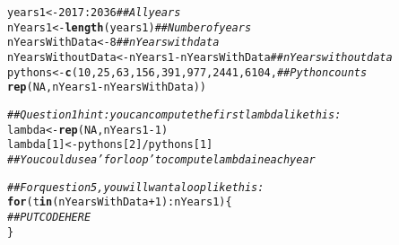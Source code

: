 \documentclass[12pt]{article}\usepackage[]{graphicx}\usepackage[]{xcolor}
\makeatletter
\newcommand{\hlnum}[1]{\textcolor[rgb]{0.686,0.059,0.569}{#1}}%
\newcommand{\hlcom}[1]{\textcolor[rgb]{0.678,0.584,0.686}{\textit{#1}}}%
\newcommand{\hlopt}[1]{\textcolor[rgb]{0,0,0}{#1}}%
\newcommand{\hldef}[1]{\textcolor[rgb]{0.345,0.345,0.345}{#1}}%
\newcommand{\hlkwa}[1]{\textcolor[rgb]{0.161,0.373,0.58}{\textbf{#1}}}%
\newcommand{\hlkwb}[1]{\textcolor[rgb]{0.69,0.353,0.396}{#1}}%
\newcommand{\hlkwd}[1]{\textcolor[rgb]{0.737,0.353,0.396}{\textbf{#1}}}%
\newenvironment{kframe}{%
 \def\at@end@of@kframe{}%
 \ifinner\ifhmode%
  \def\at@end@of@kframe{\end{minipage}}%
  \begin{minipage}{\columnwidth}%
 \fi\fi%
 \def\FrameCommand##1{\hskip\@totalleftmargin \hskip-\fboxsep
 \colorbox{shadecolor}{##1}\hskip-\fboxsep
     \hskip-\linewidth \hskip-\@totalleftmargin \hskip\columnwidth}%
 \MakeFramed {\advance\hsize-\width
   \@totalleftmargin\z@ \linewidth\hsize
   \@setminipage}}%
 {\par\unskip\endMakeFramed%
 \at@end@of@kframe}
\newenvironment{knitrout}{}{} %
\makeatother
\begin{document}
\begin{knitrout}
\color{fgcolor}\begin{kframe}
\begin{alltt}
\hldef{years1} \hlkwb{<-} \hlnum{2017}\hlopt{:}\hlnum{2036}                                  \hlcom{## All years}
\hldef{nYears1} \hlkwb{<-} \hlkwd{length}\hldef{(years1)}                            \hlcom{## Number of years}
\hldef{nYearsWithData} \hlkwb{<-} \hlnum{8}                                  \hlcom{## nYears with data}
\hldef{nYearsWithoutData} \hlkwb{<-} \hldef{nYears1}\hlopt{-}\hldef{nYearsWithData}          \hlcom{## nYears without data}
\hldef{pythons} \hlkwb{<-} \hlkwd{c}\hldef{(}\hlnum{10}\hldef{,} \hlnum{25}\hldef{,} \hlnum{63}\hldef{,} \hlnum{156}\hldef{,} \hlnum{391}\hldef{,} \hlnum{977}\hldef{,} \hlnum{2441}\hldef{,} \hlnum{6104}\hldef{,}  \hlcom{## Python counts}
             \hlkwd{rep}\hldef{(}\hlnum{NA}\hldef{, nYears1}\hlopt{-}\hldef{nYearsWithData))}

\hlcom{## Question 1 hint: you can compute the first lambda like this:}
\hldef{lambda} \hlkwb{<-} \hlkwd{rep}\hldef{(}\hlnum{NA}\hldef{, nYears1}\hlopt{-}\hlnum{1}\hldef{)}
\hldef{lambda[}\hlnum{1}\hldef{]} \hlkwb{<-} \hldef{pythons[}\hlnum{2}\hldef{]}\hlopt{/}\hldef{pythons[}\hlnum{1}\hldef{]}
\hlcom{## You could use a 'for loop' to compute lambda in each year}

\hlcom{## For question 5, you will want a loop like this:}
\hlkwa{for}\hldef{(t} \hlkwa{in} \hldef{(nYearsWithData}\hlopt{+}\hlnum{1}\hldef{)}\hlopt{:}\hldef{nYears1) \{}
   \hlcom{## PUT CODE HERE}
\hldef{\}}
\end{alltt}
\end{kframe}
\end{knitrout}



\clearpage
\end{document}
